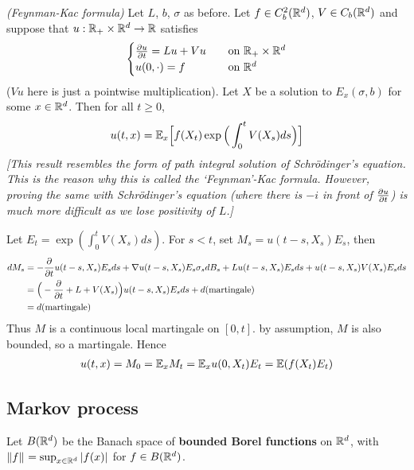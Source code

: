 \documentclass[12pt,a4paper]{article}
\newenvironment{proof}
{\begin{changemargin}{0.5cm}{0.5cm} 
	}%
	{\end{changemargin}
}
\newenvironment{p}
{\begin{proof} 
	}%
	{\end{proof}
}
\begin{document}
\thm \emph{(Feynman-Kac formula)} Let $L$, $b$, $\sigma$ as before. Let $f\in C_b^2(\mathbb{R}^d)$, $V\in C_b(\mathbb{R}^d)$ and suppose that $u: \mathbb{R}_+ \times \mathbb{R}^d \rightarrow \mathbb{R}$ satisfies
\begin{align*}
\begin{cases}
\frac{\partial u}{\partial t} = Lu + Vu \quad &\text{on } \mathbb{R}_+ \times \mathbb{R}^d\\
u(0, \cdot) = f\quad &\text{on }\mathbb{R}^d
\end{cases}
\end{align*}
($Vu$ here is just a pointwise multiplication). Let $X$ be a solution to $E_x(\sigma, b)$ for some $x\in \mathbb{R}^d$. Then for all $t\geq 0$,
\begin{align*}
u(t,x) = \mathbb{E}_x \Big[ f(X_t) \exp \Big( \int_0^t V(X_s) ds \Big) \Big]
\end{align*}
\emph{[This result resembles the form of path integral solution of Schr\"odinger's equation. This is the reason why this is called the `Feynman'-Kac formula. However, proving the same with Schr\"odinger's equation (where there is $-i$ in front of $\frac{\partial u}{\partial t}$) is much more difficult as we lose positivity of $L$.]}
\begin{p}
\pf Let $E_t = \exp (\int_0^t V(X_s) ds)$. For $s<t$, set $M_s = u(t-s, X_s) E_s$, then
\begin{align*}
dM_s &= - \frac{\partial }{\partial t} u(t-s, X_s) E_s ds + \nabla u(t-s, X_s) E_s\sigma_s dB_s + L u(t-s, X_s) E_s ds + u(t-s, X_s) V(X_s) E_s ds \\
&= \Big( -\frac{\partial}{\partial t} + L  + V(X_s) \Big)u(t-s, X_s) E_s ds + d(\text{martingale}) \\
&= d(\text{martingale})
\end{align*}
Thus $M$ is a continuous local martingale on $[0,t]$. by assumption, $M$ is also bounded, so a martingale. Hence
\begin{align*}
u(t,x) = M_0 = \mathbb{E}_x M_t = \mathbb{E}_x u(0, X_t) E_t = \mathbb{E} (f(X_t) E_t)
\end{align*}
\eop
\end{p}

\subsection{Markov process}

Let $B(\mathbb{R}^d)$ be the Banach space of \textbf{bounded Borel functions} on $\mathbb{R}^d$, with $\snorms{f}{} = \sup_{x\in \reals^d} |f(x)|$ for $f\in B(\mathbb{R}^d)$.
\s
\end{document}
